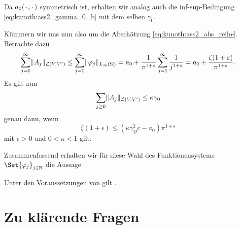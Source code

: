 \begin{Satz}
\begin{Beweis}
        Da $a_{0}({\mkern2mu\cdot\mkern2mu}, {\mkern2mu\cdot\mkern2mu})$ symmetrisch ist, erhalten wir analog auch die inf-sup-Bedingung \eqref{eq:kunoth:ass2_gamma_0_b} mit dem selben $\gamma_{0}$.

        Kümmern wir uns nun also um die Abschätzung \eqref{eq:kunoth:ass2_abs_reihe}.
        Betrachte dazu
        \begin{align}
                    \sum_{j = 0}^{\infty} \lVert A_{j}\rVert_{\mathcal L(V, V')}
            \leq    \sum_{j = 0}^{\infty} \lVert\varphi_{j}\rVert_{L_{\infty}(\Omega)}
            =       a_{0} + \frac{1}{\pi^{1+\varepsilon}} \sum_{j = 1}^{\infty} \frac{1}{j^{1+\varepsilon}}
            = a_{0} + \frac{\zeta(1+\varepsilon)}{\pi^{1+\varepsilon}}.
        \end{align}
        Es gilt nun
        \begin{equation}
            \sum_{j \geq 0} \lVert A_{j}\rVert_{\mathcal L(V, V')} \leq \kappa \gamma_{0}
        \end{equation}
        genau dann, wenn
        \begin{equation}
            \zeta(1+ \epsilon) \leq (\kappa \gamma_{\Omega}^{2} c - a_{0}) \pi^{1+\epsilon}
        \end{equation}
        mit $\epsilon > 0$ und $0 < \kappa < 1$ gilt.
    \end{Beweis}
\end{Satz}

Zusammenfassend erhalten wir für diese Wahl des Funktionensystems $\Set{ \varphi_{j} }_{j \in \mathbb{N}}$ die Aussage

\begin{Korollar}
    Unter den Voraussetzungen von  gilt .
\end{Korollar}



\clearpage
\section{Zu klärende Fragen} %
\label{sub:zu_kl_rende_fragen}

